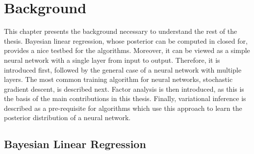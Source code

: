 \documentclass[msc,deptreport.inf]{infthesis} %
\begin{document}
\chapter{Background}\label{ch:background}

This chapter presents the background necessary to understand the rest of the thesis. Bayesian linear regression, whose posterior can be computed in closed for, provides a nice testbed for the algorithms. Moreover, it can be viewed as a simple neural network with a single layer from input to output. Therefore, it is introduced first, followed by the general case of a neural network with multiple layers. The most common training algorithm for neural networks, stochastic gradient descent, is described next. Factor analysis is then introduced, as this is the basis of the main contributions in this thesis. Finally, variational inference is described as a pre-requisite for algorithms which use this approach to learn the posterior distribution of a neural network. 

\section{Bayesian Linear Regression}\label{sec:bayesian_lr}
\end{document}
